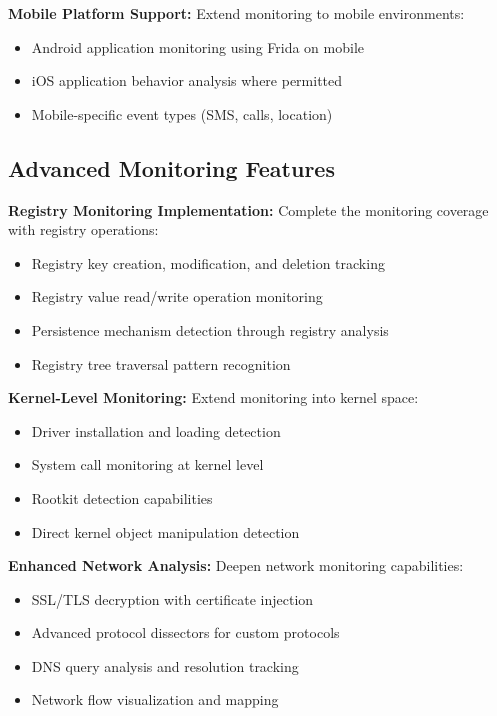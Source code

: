 \textbf{Mobile Platform Support:}
Extend monitoring to mobile environments:
\begin{itemize}
    \item Android application monitoring using Frida on mobile
    \item iOS application behavior analysis where permitted
    \item Mobile-specific event types (SMS, calls, location)
\end{itemize}

\subsection{Advanced Monitoring Features}

\textbf{Registry Monitoring Implementation:}
Complete the monitoring coverage with registry operations:
\begin{itemize}
    \item Registry key creation, modification, and deletion tracking
    \item Registry value read/write operation monitoring
    \item Persistence mechanism detection through registry analysis
    \item Registry tree traversal pattern recognition
\end{itemize}

\textbf{Kernel-Level Monitoring:}
Extend monitoring into kernel space:
\begin{itemize}
    \item Driver installation and loading detection
    \item System call monitoring at kernel level
    \item Rootkit detection capabilities
    \item Direct kernel object manipulation detection
\end{itemize}

\textbf{Enhanced Network Analysis:}
Deepen network monitoring capabilities:
\begin{itemize}
    \item SSL/TLS decryption with certificate injection
    \item Advanced protocol dissectors for custom protocols
    \item DNS query analysis and resolution tracking
    \item Network flow visualization and mapping
\end{itemize}

